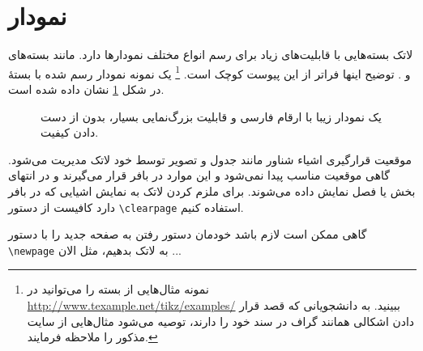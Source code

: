 \section{نمودار}

لاتک بسته‌هایی با قابلیت‌های زیاد برای رسم انواع مختلف نمودارها دارد. مانند بسته‌های  و  . 
توضیح اینها فراتر از این پیوست کوچک است.%
\footnote{
نمونه مثال‌هایی از بسته  را می‌توانید
 در \url{http://www.texample.net/tikz/examples/} ببینید. به دانشجویانی که قصد قرار دادن اشکالی همانند گراف در سند خود را دارند، توصیه می‌شود مثال‌هایی از سایت مذکور را ملاحظه فرمایند.}
یک نمونه نمودار رسم شده با بستهٔ 
 در شکل 
\ref{fig:parabola}
نشان داده شده است.
\begin{figure}[t]
\centering
{}
\caption{یک نمودار زیبا با ارقام فارسی و قابلیت بزرگ‌نمایی بسیار، بدون از دست دادن کیفیت.}
\label{fig:parabola}
\end{figure}
موقعیت قرارگیری اشیاء شناور مانند جدول و تصویر توسط خود لاتک مدیریت می‌شود. 
گاهی موقعیت مناسب پیدا نمی‌شود و این موارد در بافر قرار می‌گیرند و در انتهای بخش یا فصل نمایش داده می‌شوند. 
برای ملزم کردن لاتک به نمایش اشیايی که در بافر دارد کافیست از دستور 
\verb!\clearpage!
استفاده کنیم.

 گاهی  ممکن است لازم باشد خودمان دستور رفتن به صفحه جدید را با دستور 
\verb!\newpage!
به لاتک بدهیم، مثل الان ...
\newpage




